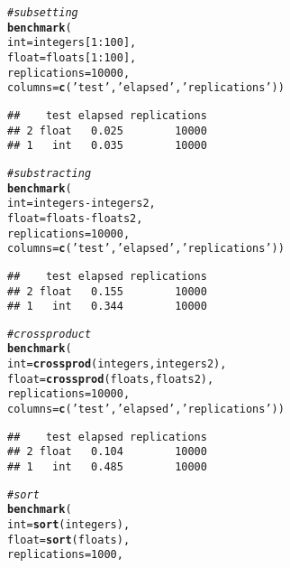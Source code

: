 \documentclass{llncs}\usepackage[]{graphicx}\usepackage[]{color}
\makeatletter
\newcommand{\hlnum}[1]{\textcolor[rgb]{0.686,0.059,0.569}{#1}}%
\newcommand{\hlstr}[1]{\textcolor[rgb]{0.192,0.494,0.8}{#1}}%
\newcommand{\hlcom}[1]{\textcolor[rgb]{0.678,0.584,0.686}{\textit{#1}}}%
\newcommand{\hlopt}[1]{\textcolor[rgb]{0,0,0}{#1}}%
\newcommand{\hlstd}[1]{\textcolor[rgb]{0.345,0.345,0.345}{#1}}%
\newcommand{\hlkwc}[1]{\textcolor[rgb]{0.333,0.667,0.333}{#1}}%
\newcommand{\hlkwd}[1]{\textcolor[rgb]{0.737,0.353,0.396}{\textbf{#1}}}%
\newenvironment{kframe}{%
 \def\at@end@of@kframe{}%
 \ifinner\ifhmode%
  \def\at@end@of@kframe{\end{minipage}}%
  \begin{minipage}{\columnwidth}%
 \fi\fi%
 \def\FrameCommand##1{\hskip\@totalleftmargin \hskip-\fboxsep
 \colorbox{shadecolor}{##1}\hskip-\fboxsep
     \hskip-\linewidth \hskip-\@totalleftmargin \hskip\columnwidth}%
 \MakeFramed {\advance\hsize-\width
   \@totalleftmargin\z@ \linewidth\hsize
   \@setminipage}}%
 {\par\unskip\endMakeFramed%
 \at@end@of@kframe}
\newenvironment{knitrout}{}{} %
\makeatother
\begin{document}
\begin{knitrout}
\color{fgcolor}\begin{kframe}
\begin{alltt}
\hlcom{#subsetting}
\hlkwd{benchmark}\hlstd{(}
  \hlkwc{int} \hlstd{= integers[}\hlnum{1}\hlopt{:}\hlnum{100}\hlstd{] ,}
  \hlkwc{float} \hlstd{= floats[}\hlnum{1}\hlopt{:}\hlnum{100}\hlstd{],}
  \hlkwc{replications} \hlstd{=} \hlnum{10000}\hlstd{,}
  \hlkwc{columns}\hlstd{=}\hlkwd{c}\hlstd{(}\hlstr{'test'}\hlstd{,} \hlstr{'elapsed'}\hlstd{,} \hlstr{'replications'}\hlstd{))}
\end{alltt}
\begin{lstlisting}[basicstyle=\ttfamily,breaklines=true]
##    test elapsed replications
## 2 float   0.025        10000
## 1   int   0.035        10000
\end{lstlisting}
\begin{alltt}
\hlcom{#substracting}
\hlkwd{benchmark}\hlstd{(}
  \hlkwc{int} \hlstd{= integers}\hlopt{-}\hlstd{integers2 ,}
  \hlkwc{float} \hlstd{= floats}\hlopt{-}\hlstd{floats2,}
  \hlkwc{replications} \hlstd{=} \hlnum{10000}\hlstd{,}
  \hlkwc{columns}\hlstd{=}\hlkwd{c}\hlstd{(}\hlstr{'test'}\hlstd{,} \hlstr{'elapsed'}\hlstd{,} \hlstr{'replications'}\hlstd{))}
\end{alltt}
\begin{lstlisting}[basicstyle=\ttfamily,breaklines=true]
##    test elapsed replications
## 2 float   0.155        10000
## 1   int   0.344        10000
\end{lstlisting}
\begin{alltt}
\hlcom{#crossproduct}
\hlkwd{benchmark}\hlstd{(}
  \hlkwc{int} \hlstd{=} \hlkwd{crossprod}\hlstd{(integers,integers2) ,}
  \hlkwc{float} \hlstd{=} \hlkwd{crossprod}\hlstd{(floats,floats2),}
  \hlkwc{replications} \hlstd{=} \hlnum{10000}\hlstd{,}
  \hlkwc{columns}\hlstd{=}\hlkwd{c}\hlstd{(}\hlstr{'test'}\hlstd{,} \hlstr{'elapsed'}\hlstd{,} \hlstr{'replications'}\hlstd{))}
\end{alltt}
\begin{lstlisting}[basicstyle=\ttfamily,breaklines=true]
##    test elapsed replications
## 2 float   0.104        10000
## 1   int   0.485        10000
\end{lstlisting}
\begin{alltt}
\hlcom{#sort}
\hlkwd{benchmark}\hlstd{(}
  \hlkwc{int} \hlstd{=} \hlkwd{sort}\hlstd{(integers) ,}
  \hlkwc{float} \hlstd{=} \hlkwd{sort}\hlstd{(floats),}
  \hlkwc{replications} \hlstd{=} \hlnum{1000}\hlstd{,}

\end{alltt}
\end{kframe}
\end{knitrout}
\end{document}
